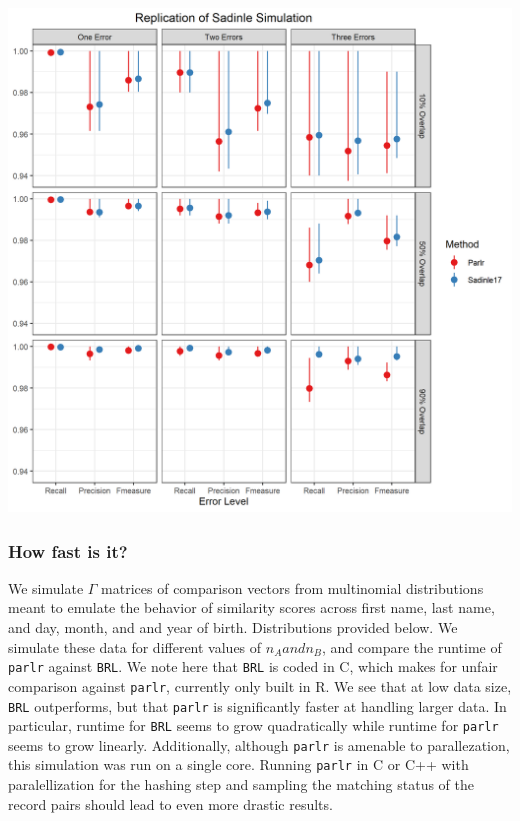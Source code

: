 \documentclass[
  12pt,
]{article}
\begin{document}
\begin{center}\includegraphics[width=29.17in]{../notes/figures/sadinle_sim_plot} \end{center}

\hypertarget{how-fast-is-it}{%
\subsubsection{How fast is it?}\label{how-fast-is-it}}

We simulate \(\Gamma\) matrices of comparison vectors from multinomial
distributions meant to emulate the behavior of similarity scores across
first name, last name, and day, month, and and year of birth.
Distributions provided below. We simulate these data for different
values of \(n_A and n_B\), and compare the runtime of \texttt{parlr}
against \texttt{BRL}. We note here that \texttt{BRL} is coded in C,
which makes for unfair comparison against \texttt{parlr}, currently only
built in R. We see that at low data size, \texttt{BRL} outperforms, but
that \texttt{parlr} is significantly faster at handling larger data. In
particular, runtime for \texttt{BRL} seems to grow quadratically while
runtime for \texttt{parlr} seems to grow linearly. Additionally,
although \texttt{parlr} is amenable to parallezation, this simulation
was run on a single core. Running \texttt{parlr} in C or C++ with
paralellization for the hashing step and sampling the matching status of
the record pairs should lead to even more drastic results.
\end{document}
